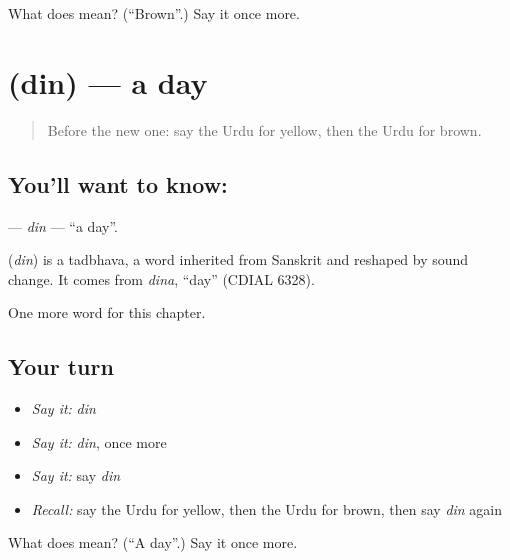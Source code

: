 \begin{tcolorbox}[breakable,colback=teal!4,colframe=teal!35!black,title={Before you move on}]
What does  mean? (\textquotedblleft{}Brown\textquotedblright{}.) Say it once more.
\end{tcolorbox}
\section[\texorpdfstring{\ur{دن} (din)}{دن (din)}]{ (din) — a day}

\label{lesson:UR-C74-din}



\begin{quote}
Before the new one: say the Urdu for yellow, then the Urdu for brown.
\end{quote}

\subsection*{You'll want to know: }
\textbf{} — \emph{din} — \textquotedblleft{}a day\textquotedblright{}.

\begin{cousinweb}
\textbf{} (\emph{din}) is a tadbhava, a word inherited from Sanskrit and reshaped by sound change. It comes from \emph{dina}, \textquotedblleft{}day\textquotedblright{} (CDIAL 6328).
\end{cousinweb}

\begin{grammarlens}[title={What you've built}]
One more word for this chapter.
\end{grammarlens}

\subsection*{Your turn}
\begin{itemize}
\raggedright
  \item \emph{Say it:} \emph{din}
  \item \emph{Say it:} \emph{din}, once more
  \item \emph{Say it:} say \emph{din}
  \item \emph{Recall:} say the Urdu for yellow, then the Urdu for brown, then say \emph{din} again
\end{itemize}

\begin{tcolorbox}[breakable,colback=teal!4,colframe=teal!35!black,title={Before you move on}]
What does  mean? (\textquotedblleft{}A day\textquotedblright{}.) Say it once more.
\end{tcolorbox}
